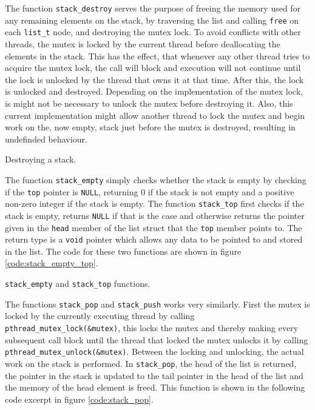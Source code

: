 The function \verb|stack_destroy| serves the purpose of freeing the memory used
for any remaining elements on the stack, by traversing the list and calling
\verb|free| on each \verb|list_t| node, and destroying the mutex lock. To avoid
conflicts with other threads, the mutex is locked by the current thread before
deallocating the elements in the stack. This has the effect, that whenever any
other thread tries to acquire the mutex lock, the call will block and execution
will not continue until the lock is unlocked by the thread that owns it at that
time. After this, the lock is unlocked and destroyed. Depending on the
implementation of the mutex lock, is might not be necessary to unlock the mutex
before destroying it. Also, this current implementation might allow another
thread to lock the mutex and begin work on the, now empty, stack just before the
mutex is destroyed, resulting in undefinded behaviour.

        {Destroying a stack.}

The function \verb|stack_empty| simply checks whether the stack is empty by
checking if the \verb|top| pointer is \verb|NULL|, returning 0 if the stack is
not empty and a positive non-zero integer if the stack is empty. The function
\verb|stack_top| first checks if the stack is empty, returns \verb|NULL| if that
is the case and otherwise returns the pointer given in the \verb|head| member of
the list struct that the \verb|top| member points to. The return type is a
\verb|void| pointer which allows any data to be pointed to and stored in the
list.  The code for these two functions are shown in figure
\ref{code:stack_empty_top}.


        {\texttt{stack\_empty} and \texttt{stack\_top} functions.}

The functions \verb|stack_pop| and \verb|stack_push| works very similarly. First
the mutex is locked by the currently executing thread by calling
\verb|pthread_mutex_lock(&mutex)|, this locks the mutex and thereby making every
subsequent call block until the thread that locked the mutex unlocks it by
calling \verb|pthread_mutex_unlock(&mutex)|. Between the locking and unlocking,
the actual work on the stack is performed. In \verb|stack_pop|, the head of the
list is returned, the pointer in the stack is updated to the tail pointer in the
head of the list and the memory of the head element is freed. This
function is shown in the following code excerpt in figure \ref{code:stack_pop}.

